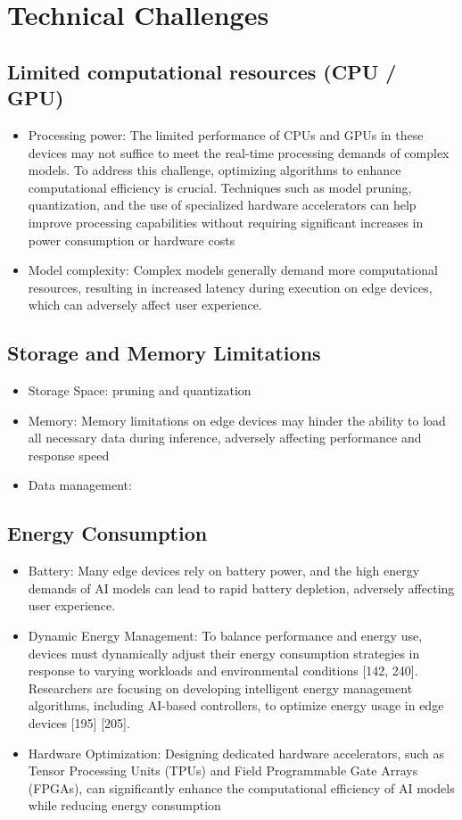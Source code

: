 \section{Technical Challenges}

\subsection{Limited computational resources (CPU / GPU)}
\begin{itemize}
	\item Processing power:  The limited performance of CPUs and GPUs in these
		devices may not suffice to meet the real-time processing demands of
		complex models. To address this challenge, optimizing algorithms to
		enhance computational efficiency is crucial. Techniques such as model
		pruning, quantization, and the use of specialized hardware accelerators
		can help improve processing capabilities without requiring significant
		increases in power consumption or hardware costs 
	\item Model complexity: Complex models generally demand more computational
		resources, resulting in increased latency during execution on edge
		devices, which can adversely affect user experience.
\end{itemize}

\subsection{Storage and Memory Limitations}

\begin{itemize}
	\item Storage Space: pruning and quantization
	\item Memory: Memory limitations on edge devices may hinder the ability to load all necessary data during inference, adversely affecting performance and response speed 
	\item Data management: 
\end{itemize}

\subsection{Energy Consumption}
\begin{itemize}
	\item Battery: Many edge devices rely on battery power, and the high energy demands of AI models can lead to rapid battery depletion, adversely affecting user experience.
	\item Dynamic Energy Management: To balance performance and energy use, devices must dynamically adjust their energy consumption strategies in response to varying workloads and environmental conditions [142, 240]. Researchers are focusing on developing intelligent energy management algorithms, including AI-based controllers, to optimize energy usage in edge devices [195] [205].
	\item Hardware Optimization: Designing dedicated hardware accelerators, such as Tensor Processing Units (TPUs) and Field Programmable Gate Arrays (FPGAs), can significantly enhance the computational efficiency of AI models while reducing energy consumption
\end{itemize}

